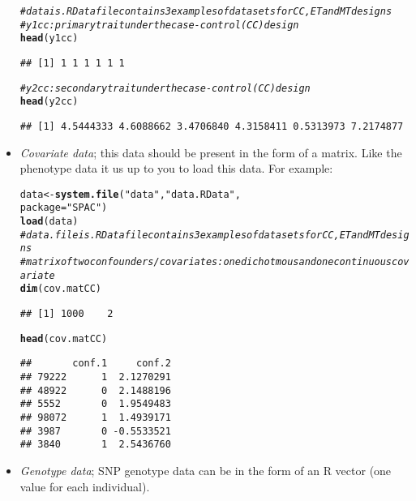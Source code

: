 \documentclass{article}\usepackage[]{graphicx}\usepackage[]{color}
\makeatletter
\newcommand{\hlstr}[1]{\textcolor[rgb]{0.192,0.494,0.8}{#1}}%
\newcommand{\hlcom}[1]{\textcolor[rgb]{0.678,0.584,0.686}{\textit{#1}}}%
\newcommand{\hlstd}[1]{\textcolor[rgb]{0.345,0.345,0.345}{#1}}%
\newcommand{\hlkwb}[1]{\textcolor[rgb]{0.69,0.353,0.396}{#1}}%
\newcommand{\hlkwc}[1]{\textcolor[rgb]{0.333,0.667,0.333}{#1}}%
\newcommand{\hlkwd}[1]{\textcolor[rgb]{0.737,0.353,0.396}{\textbf{#1}}}%
\newenvironment{kframe}{%
 \def\at@end@of@kframe{}%
 \ifinner\ifhmode%
  \def\at@end@of@kframe{\end{minipage}}%
  \begin{minipage}{\columnwidth}%
 \fi\fi%
 \def\FrameCommand##1{\hskip\@totalleftmargin \hskip-\fboxsep
 \colorbox{shadecolor}{##1}\hskip-\fboxsep
     \hskip-\linewidth \hskip-\@totalleftmargin \hskip\columnwidth}%
 \MakeFramed {\advance\hsize-\width
   \@totalleftmargin\z@ \linewidth\hsize
   \@setminipage}}%
 {\par\unskip\endMakeFramed%
 \at@end@of@kframe}
\newenvironment{knitrout}{}{} %
\makeatother
\begin{document}
\begin{itemize}
\begin{knitrout}
\begin{kframe}
\begin{alltt}
\hlcom{# data is .RData file contains 3 examples of data sets for CC, ET and MT designs}
\hlcom{# y1cc: primary trait under the case-control (CC) design}
  \hlkwd{head}\hlstd{(y1cc)}
\end{alltt}
\begin{verbatim}
## [1] 1 1 1 1 1 1
\end{verbatim}
\begin{alltt}
\hlcom{# y2cc: secondary trait under the case-control (CC) design}
  \hlkwd{head}\hlstd{(y2cc)}
\end{alltt}
\begin{verbatim}
## [1] 4.5444333 4.6088662 3.4706840 4.3158411 0.5313973 7.2174877
\end{verbatim}
\end{kframe}
\end{knitrout}
\item \emph{Covariate data}; this data should be present in the form
  of a matrix. Like the phenotype data it us up to you to load this
  data. For example:
\begin{knitrout}
\color{fgcolor}\begin{kframe}
\begin{alltt}
  \hlstd{data} \hlkwb{<-} \hlkwd{system.file}\hlstd{(}\hlstr{"data"}\hlstd{,}\hlstr{"data.RData"}\hlstd{,}
                            \hlkwc{package}\hlstd{=}\hlstr{"SPAC"}\hlstd{)}
  \hlkwd{load}\hlstd{(data)}
\hlcom{# data.file is .RData file contains 3 examples of data sets for CC, ET and MT designs}
\hlcom{# matrix of two confounders/covariates: one dichotmous and one continuous covariate}
  \hlkwd{dim}\hlstd{(cov.matCC)}
\end{alltt}
\begin{verbatim}
## [1] 1000    2
\end{verbatim}
\begin{alltt}
  \hlkwd{head}\hlstd{(cov.matCC)}
\end{alltt}
\begin{verbatim}
##       conf.1     conf.2
## 79222      1  2.1270291
## 48922      0  2.1488196
## 5552       0  1.9549483
## 98072      1  1.4939171
## 3987       0 -0.5533521
## 3840       1  2.5436760
\end{verbatim}
\end{kframe}
\end{knitrout}
\item \emph{Genotype data}; SNP genotype data can be in the form of
  an R vector (one value for each individual).

\end{itemize}
\end{document}
